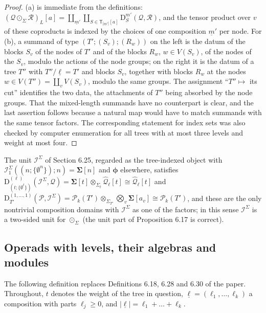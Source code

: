 \documentclass[12pt]{article}
\theoremstyle{plain}
\theoremstyle{definition}
\theoremstyle{remark}
\newcommand{\Cal}[1]{\mathcal{#1}}
\newcommand{\circdot}{\odot}
\newcommand{\Isym}{\Cal{I}^{\Sigma}}
\newcommand{\ptC}{\boldsymbol{\phi}}
\newcommand{\Tr}{\mathsf{T}}
\newcommand{\Dm}{\mathrm{D}}
\begin{document}
\begin{proof}
(a) is immediate from the definitions: $(\Cal Q\circdot_\Sigma\Cal R)_{L}[a]=\coprod_{\underline m'}\coprod_{S\in\Tr_{|\underline m'|}[a]}\Dm^{\underline m'}_S(\Cal Q,\Cal R)$, and the tensor product over $v$ of these coproducts is indexed by the choices of one composition $\underline m'$ per node. For (b), a summand of type $(T';(S_v);(R_w))$ on the left is the datum of the blocks $S_v$ of the nodes of $T'$ and of the blocks $R_w$, $w\in V(S_v)$, of the nodes of the $S_v$, modulo the actions of the node groups; on the right it is the datum of a tree $T''$ with $T''/\underline\ell=T'$ and blocks $S_v$, together with blocks $R_w$ at the nodes $w\in V(T'')=\coprod_vV(S_v)$, modulo the same groups. The assignment ``$T''\mapsto$ its cut'' identifies the two data, the attachments of $T''$ being absorbed by the node groups. That the mixed-length summands have no counterpart is clear, and the last assertion follows because a natural map would have to match summands with the same tensor factors. The corresponding statement for index sets was also checked by computer enumeration for all trees with at most three levels and weight at most four.
\end{proof}

The unit $\Isym$ of Section 6.25, regarded as the tree-indexed object with $\Isym_1((n;\{\emptyset^n\});n)=\mathbf\Sigma[n]$ and $\ptC$ elsewhere, satisfies $\Dm^{(\ell)}_{(t;\{\emptyset^t\})}(\Isym,\Cal Q)=\mathbf\Sigma[t]\otimes_{\Sigma_t}\widehat{\Cal Q}_\ell[t]\cong\widehat{\Cal Q}_\ell[t]$ and $\Dm^{(1,\dots,1)}_{T'}(\Cal P,\Isym)=\Cal P_k(T')\otimes_{\Sigma_{T'}}\bigotimes_v\mathbf\Sigma[a_v]\cong\Cal P_k(T')$, and these are the only nontrivial composition domains with $\Isym$ as one of the factors; in this sense $\Isym$ is a two-sided unit for $\circdot_\Sigma$ (the unit part of Proposition 6.17 is correct).

\subsection{Operads with levels, their algebras and modules}
\label{sec:corr:operads}

The following definition replaces Definitions 6.18, 6.28 and 6.30 of the paper. Throughout, $t$ denotes the weight of the tree in question, $\underline\ell=(\ell_1,\dots,\ell_k)$ a composition with parts $\ell_j\geq0$, and $|\underline\ell|=\ell_1+\dots+\ell_k$.
\end{document}
